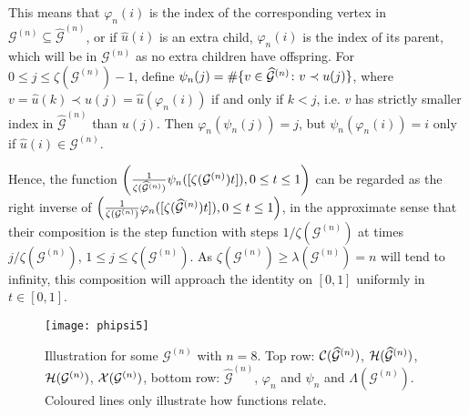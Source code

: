 \documentclass[11pt,a4paper]{article}
\newcommand{\cG}{\mathcal{G}}
\begin{document}
This means that $\varphi_n(i)$ is the index of the corresponding vertex in $\cG^{(n)}\subseteq\widehat{\cG}^{(n)}$, or if $\widehat{u}(i)$ is an extra child, $\varphi_n(i)$ is the index of its parent, which will be in $\cG^{(n)}$ as no extra children have offspring.  For $0\le j\le\zeta(\cG^{(n)})-1$, define $\psi_n(j)=\#\{v\in \widehat{{\cal G}}^{(n)}\colon v\prec u(j)\}$,  where $v=\widehat{u}(k)\prec u(j)=\widehat{u}(\varphi_n(i))$ if and only if $k<j$, i.e. $v$ has strictly smaller index in $\widehat{\cG}^{(n)}$ than $u(j)$. Then $\varphi_n(\psi_n(j))=j$, but $\psi_n(\varphi_n(i))=i$ only if $\widehat{u}(i)\in\cG^{(n)}$.

Hence, the function
$\left(\frac{1}{\zeta(\widehat{{\cal G}}^{(n)} )}\psi_n([\zeta({\cal G}^{(n)} ) t ]), 0\leq t\leq1\right)$ can be regarded as the right inverse of 
$\left(\frac{1}{\zeta({\cal G}^{(n)} )}\varphi_n([\zeta(\widehat{{\cal G}}^{(n)} ) t ]), 0\leq t\leq1\right)$, in the approximate sense that their composition is the step 
function with steps $1/\zeta(\cG^{(n)})$ at times $j/\zeta(\cG^{(n)})$, $1\le j\le\zeta(\cG^{(n)})$. As $\zeta(\cG^{(n)})\ge\lambda(\cG^{(n)})=n$ will tend to infinity, 
this composition will approach the identity on $[0,1]$ uniformly in $t\in[0,1]$.
\begin{figure}[t]\centering
\texttt{[image: phipsi5]}%
  \caption{Illustration for some $\cG^{(n)}$ with $n=8$. Top row: ${\cal C}(\widehat{\cG}^{(n)})$, ${\cal H}(\widehat{\cG}^{(n)})$, ${\cal H}(\cG^{(n)})$, ${\cal X}(\cG^{(n)})$, bottom row: $\widehat{\cG}^{(n)}$, $\varphi_n$ and $\psi_n$ and $\Lambda(\cG^{(n)})$. Coloured lines only illustrate how functions relate.}
    \label{fig2}\vspace{-0.2cm}
\end{figure}
\end{document}
